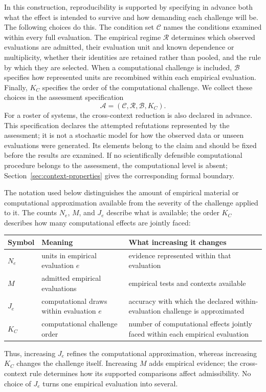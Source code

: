 \documentclass[11pt]{article}
\newcommand{\Regime}{\mathcal{R}}
\newcommand{\Assess}{\mathcal{A}}
\newcommand{\CSet}{\mathcal{C}}
\newcommand{\Boot}{\mathcal{B}}
\theoremstyle{remark}
\begin{document}
In this construction, reproducibility is supported by specifying in advance
both what the effect is intended to survive and how demanding each challenge
will be. The following choices do this. The condition set $\CSet$ names the conditions
examined within every full evaluation. The empirical regime $\Regime$
determines which observed evaluations are admitted, their evaluation unit and
known dependence or multiplicity, whether their identities are retained rather
than pooled, and the rule by which they are selected. When a computational
challenge is included, $\Boot$ specifies how represented units are recombined
within each empirical evaluation. Finally, $K_C$ specifies the order of the computational challenge. We collect these choices in the
assessment specification
\[
\Assess
=
(\CSet,\Regime,\Boot,K_C).
\]
For a roster of systems, the cross-context reduction is also declared in
advance. This specification declares the attempted refutations represented by the
assessment; it is not a stochastic model for how the observed data or unseen
evaluations were generated. Its elements belong to the claim and should be
fixed before the results are examined. If no scientifically defensible
computational procedure belongs to the assessment, the computational level is
absent; Section~\ref{sec:context-properties} gives the corresponding formal boundary.

The notation used below distinguishes the amount of empirical material or
computational approximation available from the severity of the challenge
applied to it. The counts $N_e$, $M$, and $J_e$ describe what is available; the
order $K_C$ describes how many computational effects are jointly faced:
\begin{center}
\begin{tabularx}{0.96\textwidth}{@{}l>{\raggedright\arraybackslash}X>{\raggedright\arraybackslash}X@{}}
\toprule
Symbol & Meaning & What increasing it changes \\
\midrule
$N_e$ & units in empirical evaluation $e$ & evidence represented within that evaluation \\
$M$ & admitted empirical evaluations & empirical tests and contexts available \\
$J_e$ & computational draws within evaluation $e$ & accuracy with which the declared within-evaluation challenge is approximated \\
$K_C$ & computational challenge order & number of computational effects jointly faced within each empirical evaluation \\
\bottomrule
\end{tabularx}
\end{center}
Thus, increasing $J_e$ refines the computational approximation, whereas
increasing $K_C$ changes the challenge itself. Increasing $M$ adds empirical evidence; the cross-context rule determines
how its supported comparisons affect admissibility. No choice of $J_e$ turns one empirical
evaluation into several.
\end{document}
